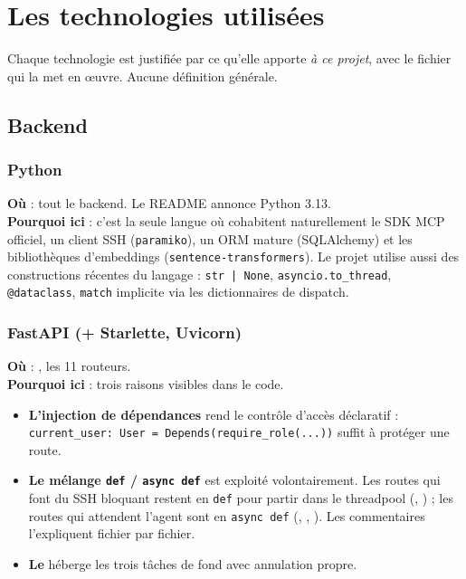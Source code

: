 \chapter{Les technologies utilisées}
\label{ch:technos}

Chaque technologie est justifiée par ce qu'elle apporte \emph{à ce projet},
avec le fichier qui la met en œuvre. Aucune définition générale.

\section{Backend}

\subsection{Python}
\textbf{Où} : tout le backend. Le README annonce Python 3.13.\\
\textbf{Pourquoi ici} : c'est la seule langue où cohabitent naturellement le SDK
MCP officiel, un client SSH (\texttt{paramiko}), un ORM mature (SQLAlchemy) et
les bibliothèques d'embeddings (\texttt{sentence-transformers}). Le projet
utilise aussi des constructions récentes du langage : \texttt{str | None},
\texttt{asyncio.to\_thread}, \texttt{@dataclass}, \texttt{match} implicite via
les dictionnaires de dispatch.

\subsection{FastAPI (+ Starlette, Uvicorn)}
\textbf{Où} : , les 11 routeurs.\\
\textbf{Pourquoi ici} : trois raisons visibles dans le code.
\begin{itemize}
  \item \textbf{L'injection de dépendances} rend le contrôle d'accès
  déclaratif : \texttt{current\_user: User = Depends(require\_role(...))} suffit
  à protéger une route.
  \item \textbf{Le mélange \texttt{def} / \texttt{async def}} est exploité
  volontairement. Les routes qui font du SSH bloquant restent en \texttt{def}
  pour partir dans le threadpool (, ) ; les
  routes qui attendent l'agent sont en \texttt{async def} (,
  , ). Les commentaires l'expliquent
  fichier par fichier.
  \item \textbf{Le } héberge les trois tâches de fond avec
  annulation propre.
\end{itemize}

